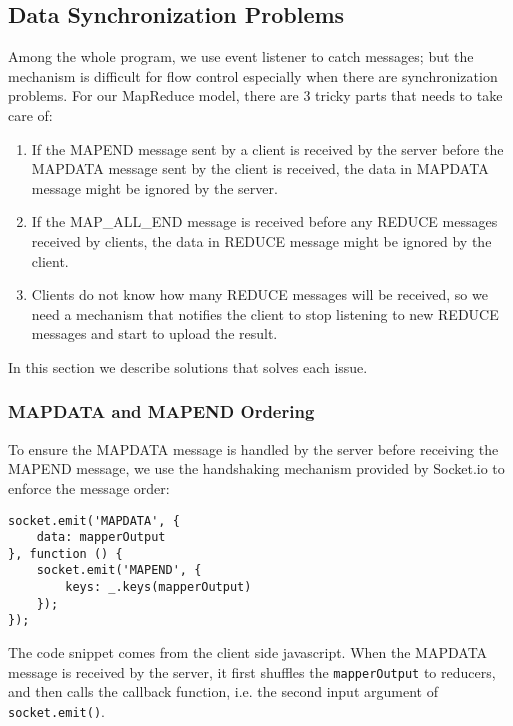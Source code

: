 \subsection{Data Synchronization Problems}

Among the whole program, we use event listener to catch messages; but the mechanism is difficult for flow control especially when there are synchronization problems. For our MapReduce model, there are 3 tricky parts that needs to take care of:

\begin{enumerate}

\item If the MAPEND message sent by a client is received by the server before the MAPDATA message sent by the client is received, the data in MAPDATA message might be ignored by the server.

\item If the MAP\_ALL\_END message is received before any REDUCE messages received by clients, the data in REDUCE message might be ignored by the client.

\item Clients do not know how many REDUCE messages will be received, so we need a mechanism that notifies the client to stop listening to new REDUCE messages and start to upload the result.

\end{enumerate}

In this section we describe solutions that solves each issue.

\subsubsection{MAPDATA and MAPEND Ordering}

To ensure the MAPDATA message is handled by the server before receiving the MAPEND message, we use the handshaking mechanism provided by Socket.io to enforce the message order:

\begin{verbatim}
socket.emit('MAPDATA', {
    data: mapperOutput
}, function () {
    socket.emit('MAPEND', {
        keys: _.keys(mapperOutput)
    });
});
\end{verbatim}

The code snippet comes from the client side javascript. When the MAPDATA message is received by the server, it first shuffles the \texttt{mapperOutput} to reducers, and then calls the callback function, i.e. the second input argument of \texttt{socket.emit()}.

